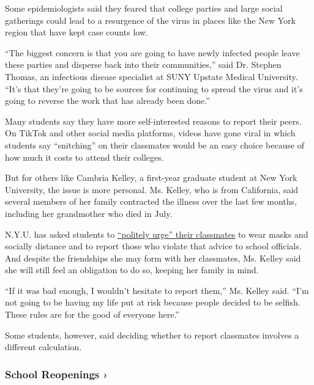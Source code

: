 Some epidemiologists said they feared that college parties and large
social gatherings could lead to a resurgence of the virus in places like
the New York region that have kept case counts low.

``The biggest concern is that you are going to have newly infected
people leave these parties and disperse back into their communities,''
said Dr. Stephen Thomas, an infectious disease specialist at SUNY
Upstate Medical University. ``It's that they're going to be sources for
continuing to spread the virus and it's going to reverse the work that
has already been done.''

Many students say they have more self-interested reasons to report their
peers. On TikTok and other social media platforms, videos have gone
viral in which students say ``snitching'' on their classmates would be
an easy choice because of how much it costs to attend their colleges.

But for others like Cambria Kelley, a first-year graduate student at New
York University, the issue is more personal. Ms. Kelley, who is from
California, said several members of her family contracted the illness
over the last few months, including her grandmother who died in July.

N.Y.U. has asked students to
\href{https://www.nyu.edu/life/safety-health-wellness/coronavirus-information/safety-and-health/coronavirus-testing/student-coronavirus-testing.html}{``politely
urge'' their classmates} to wear masks and socially distance and to
report those who violate that advice to school officials. And despite
the friendships she may form with her classmates, Ms. Kelley said she
will still feel an obligation to do so, keeping her family in mind.

``If it was bad enough, I wouldn't hesitate to report them,'' Ms. Kelley
said. ``I'm not going to be having my life put at risk because people
decided to be selfish. These rules are for the good of everyone here.''

Some students, however, said deciding whether to report classmates
involves a different calculation.

\href{https://www.nytimes3xbfgragh.onion/spotlight/schools-reopening?action=click\&pgtype=Article\&state=default\&region=MAIN_CONTENT_3\&context=storylines_keepup}{}

\hypertarget{school-reopenings-}{%
\subsubsection{School Reopenings ›}\label{school-reopenings-}}

